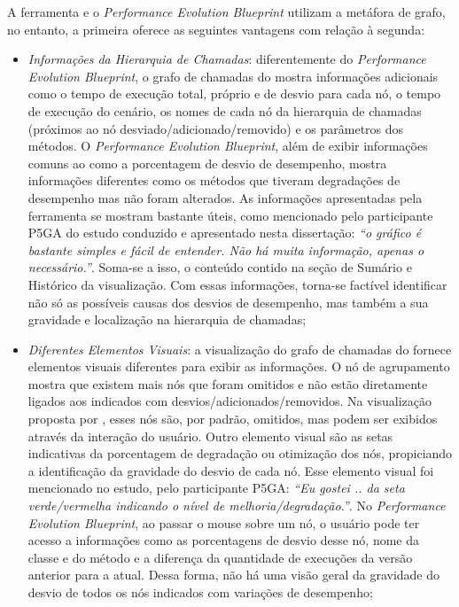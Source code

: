 A ferramenta {\textit{\toolName}} e o \textit{Performance Evolution Blueprint} utilizam a metáfora de grafo, no entanto, a primeira oferece as seguintes vantagens com relação à segunda:
\begin{itemize}
   \item \textit{Informações da Hierarquia de Chamadas}: diferentemente do \textit{Performance Evolution Blueprint}, o grafo de chamadas do {\textit{\toolName}} mostra informações adicionais como o tempo de execução total, próprio e de desvio para cada nó, o tempo de execução do cenário, os nomes de cada nó da hierarquia de chamadas (próximos ao nó desviado/adicionado/removido) e os parâmetros dos métodos. O \textit{Performance Evolution Blueprint}, além de exibir informações comuns ao {\textit{\toolName}} como a porcentagem de desvio de desempenho, mostra informações diferentes como os métodos que tiveram degradações de desempenho mas não foram alterados. As informações apresentadas pela ferramenta {\textit{\toolName}} se mostram bastante úteis, como mencionado pelo participante P5GA do estudo conduzido e apresentado nesta dissertação: \textit{``o gráfico é bastante simples e fácil de entender. Não há muita informação, apenas o necessário.''}. Soma-se a isso, o conteúdo contido na seção de Sumário e Histórico da visualização. Com essas informações, torna-se factível identificar não só as possíveis causas dos desvios de desempenho, mas também a sua gravidade e localização na hierarquia de chamadas;
   \item \textit{Diferentes Elementos Visuais}: a visualização do grafo de chamadas do {\textit{\toolName}} fornece elementos visuais diferentes para exibir as informações. O nó de agrupamento mostra que existem mais nós que foram omitidos e não estão diretamente ligados aos indicados com desvios/adicionados/removidos. Na visualização proposta por \citeauthor{SandovalAlcocer2013}, esses nós são, por padrão, omitidos, mas podem ser exibidos através da interação do usuário. Outro elemento visual são as setas indicativas da porcentagem de degradação ou otimização dos nós, propiciando a identificação da gravidade do desvio de cada nó. Esse elemento visual foi mencionado no estudo, pelo participante P5GA: \textit{``Eu gostei .. da seta verde/vermelha indicando o nível de melhoria/degradação.''}. No \textit{Performance Evolution Blueprint}, ao passar o mouse sobre um nó, o usuário pode ter acesso a informações como as porcentagens de desvio desse nó, nome da classe e do método e a diferença da quantidade de execuções da versão anterior para a atual. Dessa forma, não há uma visão geral da gravidade do desvio de todos os nós indicados com variações de desempenho;

\end{itemize}

